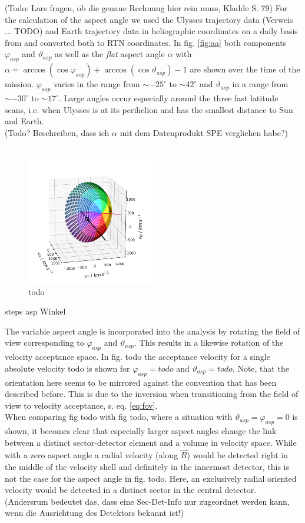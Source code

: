 (Todo: Lars fragen, ob die genaue Rechnung hier rein muss, Kladde S. 79)
For the calculation of the aspect angle we used the Ulysses trajectory data (Verweis ... TODO) and Earth trajectory data in heliographic coordinates on a daily basis from \citet{nasa-earth-coord} and converted both to RTN coordinates. In fig. \ref{fig:aa} both components $\varphi_{asp}$ and $\vartheta_{asp}$ as well as the \textit{flat} aspect angle $\alpha$ with  $\alpha = \arccos(\cos{\varphi_{asp}}) + \arccos(\cos{\vartheta_{asp}}) -1$ are shown over the time of the mission. $\varphi_{asp}$ varies in the range from $\sim - 25^\circ$ to $\sim 42^\circ$ and $\vartheta_{asp}$ in a range from $\sim - 30^\circ$ to $\sim 17^\circ$. Large angles occur especially around the three fast latitude scans, i.e. when Ulysses is at its perihelion and has the smallest distance to Sun and Earth.\\
(Todo? Beschreiben, dass ich $\alpha$ mit dem Datenprodukt SPE verglichen habe?)
\\ \\
\begin{figure}[h]
	\includegraphics[width=0.5\textwidth]{Figures/col_aa_marker.png}
	\centering
	\caption{todo}
	\label{todo}
\end{figure}
steps asp Winkel

The variable aspect angle is incorporated into the analysis by rotating the field of view corresponding to $\varphi_{asp}$ and $\vartheta_{asp}$. This results in a likewise rotation of the velocity acceptance space. In fig. todo the acceptance velocity for a single absolute velocity todo is shown for $\varphi_{asp} = todo $ and $\vartheta_{asp} = todo $. Note, that the orientation here seems to be mirrored against the convention that has been described before. This is due to the inversion when transitioning from the field of view to velocity acceptance, s. eq. \ref{eq:fov}.\\
When comparing fig todo with fig todo, where a situation with $\vartheta_{asp} = \varphi_{asp} = 0$ is shown, it becomes clear that especially larger aspect angles change the link between a distinct sector-detector element and a volume in velocity space. While with a zero aspect angle a radial velocity (along $\vec{R}$) would be detected right in the middle of the velocity shell and definitely in the innermost detector, this is not the case for the aspect angle in fig. todo. Here, an exclusively radial oriented velocity would be detected in a distinct sector in the central detector. (Andersrum bedeutet das, dass eine Sec-Det-Info nur zugeordnet werden kann, wenn die Ausrichtung des Detektors bekannt ist!)

